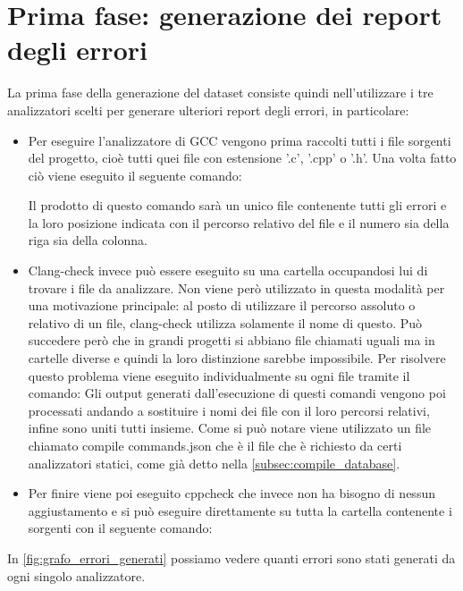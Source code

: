 \section{Prima fase: generazione dei report degli errori}
La prima fase della generazione del dataset consiste quindi nell'utilizzare i tre analizzatori scelti per generare ulteriori report degli errori, in particolare:
    \begin{itemize}
      \item Per eseguire l'analizzatore di GCC vengono prima raccolti tutti i file sorgenti del progetto, cioè tutti quei file con estensione '.c', '.cpp' o '.h'. Una volta fatto ciò viene eseguito il seguente comando:

            Il prodotto di questo comando sarà un unico file contenente tutti gli errori e la loro posizione indicata con il percorso relativo del file e il numero sia della riga sia della colonna.
      \item Clang-check invece può essere eseguito su una cartella occupandosi lui di trovare i file da analizzare.
             Non viene però utilizzato in questa modalità per una motivazione principale: al posto di utilizzare il percorso assoluto o relativo di un file, clang-check utilizza solamente il nome di questo. Può succedere però che in grandi progetti si abbiano file chiamati uguali ma in cartelle diverse e quindi la loro distinzione sarebbe impossibile.
             Per risolvere questo problema viene eseguito individualmente su ogni file tramite il comando:
            Gli output generati dall'esecuzione di questi comandi vengono poi processati andando a sostituire i nomi dei file con il loro percorsi relativi, infine sono uniti tutti insieme. 
            Come si può notare viene utilizzato un file chiamato compile commands.json che è il file che è richiesto da certi analizzatori statici, come già detto nella \autoref{subsec:compile_database}.
      \item Per finire viene poi eseguito cppcheck che invece non ha bisogno di nessun aggiustamento e si può eseguire direttamente su tutta la cartella contenente i sorgenti con il seguente comando:
    \end{itemize}
    In \autoref{fig:grafo_errori_generati} possiamo vedere quanti errori sono stati generati da ogni singolo analizzatore.


